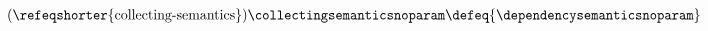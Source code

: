 \begin{sidedefinition}{}
  \begin{align} \tag{\refeqshorter{collecting-semantics}}
    \collectingsemanticsnoparam \defeq \{ \dependencysemanticsnoparam \}
  \end{align}
\end{sidedefinition}
